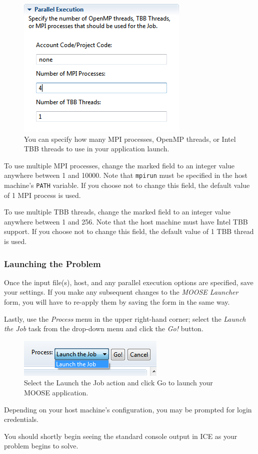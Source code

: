 \begin{figure}[htbp]
\centering
\includegraphics{figures/ICE_ParallelExecution.png}
\caption{You can specify how many MPI processes, OpenMP threads, or Intel TBB threads to use in your application launch.}
\end{figure}

To use multiple MPI processes, change the marked field to an integer
value anywhere between 1 and 10000. Note that \texttt{mpirun} must be
specified in the host machine's \texttt{PATH} variable. If you choose
not to change this field, the default value of 1 MPI process is used.

To use multiple TBB threads, change the marked field to an integer value
anywhere between 1 and 256. Note that the host machine must have Intel
TBB support. If you choose not to change this field, the default value
of 1 TBB thread is used.

\subsubsection{Launching the Problem}\label{launching-the-problem}

Once the input file(s), host, and any parallel execution options are
specified, save your settings. If you make any subsequent changes to the
\emph{MOOSE Launcher} form, you will have to re-apply them by saving the
form in the same way.

Lastly, use the \emph{Process} menu in the upper right-hand corner;
select the \emph{Launch the Job} task from the drop-down menu and click
the \emph{Go!} button.

\begin{figure}[htbp]
\centering
\includegraphics{figures/ICE_LaunchJob.png}
\caption{Select the Launch the Job action and click Go to launch your MOOSE application.}
\end{figure}

Depending on your host machine's configuration, you may be prompted for
login credentials.

You should shortly begin seeing the standard console output in ICE as
your problem begins to solve.
